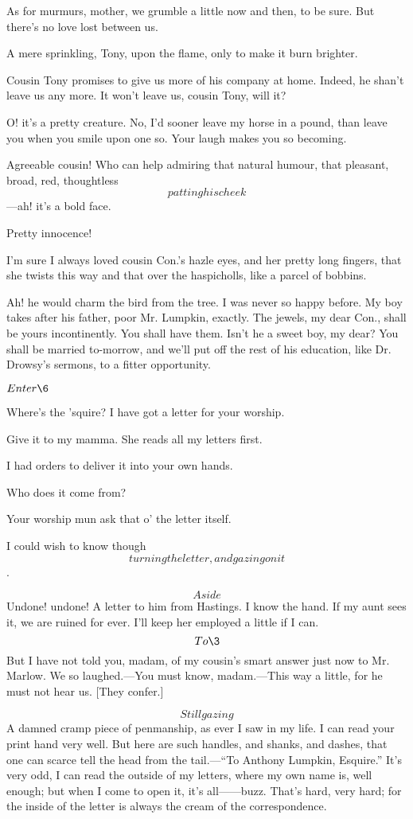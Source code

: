 \documentclass{book}
\begin{document}
\5  As for murmurs, mother, we grumble a little now and then, to be
sure.  But there's no love lost between us.

\7  A mere sprinkling, Tony, upon the flame, only to make
it burn brighter.

\9  Cousin Tony promises to give us more of his company at
home.  Indeed, he shan't leave us any more.  It won't leave us, cousin
Tony, will it?

\5  O! it's a pretty creature.  No, I'd sooner leave my horse in a
pound, than leave you when you smile upon one so.  Your laugh makes you
so becoming.

\9  Agreeable cousin!  Who can help admiring that natural
humour, that pleasant, broad, red, thoughtless \[patting his cheek\]---ah!
it's a bold face.

\7  Pretty innocence!

\5  I'm sure I always loved cousin Con.'s hazle eyes, and her
pretty long fingers, that she twists this way and that over the
haspicholls, like a parcel of bobbins.

\7  Ah! he would charm the bird from the tree.  I was
never so happy before.  My boy takes after his father, poor Mr.
Lumpkin, exactly.  The jewels, my dear Con., shall be yours
incontinently.  You shall have them.  Isn't he a sweet boy, my dear? 
You shall be married to-morrow, and we'll put off the rest of his
education, like Dr. Drowsy's sermons, to a fitter opportunity.


\(Enter \6\)


\6  Where's the 'squire?  I have got a letter for your worship.

\5  Give it to my mamma.  She reads all my letters first.

\6  I had orders to deliver it into your own hands.

\5  Who does it come from?

\6  Your worship mun ask that o' the letter itself.

\5  I could wish to know though \[turning the letter, and gazing on
it\].

\9  \[Aside\]  Undone! undone!  A letter to him from
Hastings.  I know the hand.  If my aunt sees it, we are ruined for
ever.  I'll keep her employed a little if I can.  \[To \3\]  But I have not told you, madam, of my cousin's smart
answer just now to Mr. Marlow.  We so laughed.---You must know,
madam.---This way a little, for he must not hear us.  [They confer.]

\5  \[Still gazing\]  A damned cramp piece of penmanship, as ever I
saw in my life.  I can read your print hand very well.  But here are
such handles, and shanks, and dashes, that one can scarce tell the head
from the tail.---``To Anthony Lumpkin, Esquire.''  It's very odd, I can
read the outside of my letters, where my own name is, well enough; but
when I come to open it, it's all------buzz.  That's hard, very hard; for
the inside of the letter is always the cream of the correspondence.
\end{document}
